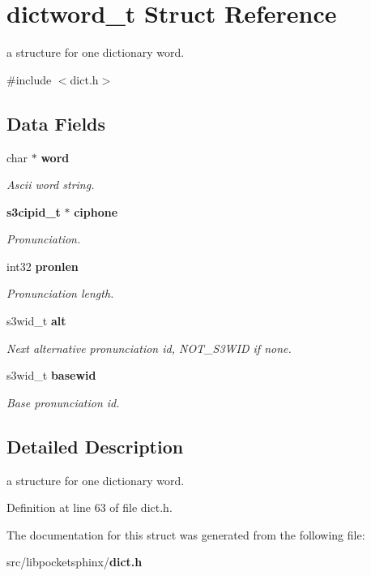\section{dictword\-\_\-t Struct Reference}
\label{structdictword__t}


a structure for one dictionary word.  




{\ttfamily \#include $<$dict.\-h$>$}

\subsection*{Data Fields}
\begin{DoxyCompactItemize}
\item 
char $\ast$ {\bf word}\label{structdictword__t_a3f3371918a406e26817bd4f2cecd7329}

\begin{DoxyCompactList}\small\item\em Ascii word string. \end{DoxyCompactList}\item 
{\bf s3cipid\-\_\-t} $\ast$ {\bf ciphone}\label{structdictword__t_acf5836b5a681485868e9090ad67366d5}

\begin{DoxyCompactList}\small\item\em Pronunciation. \end{DoxyCompactList}\item 
int32 {\bf pronlen}\label{structdictword__t_a50509f28a4b64d76519bfadea12f0fa0}

\begin{DoxyCompactList}\small\item\em Pronunciation length. \end{DoxyCompactList}\item 
s3wid\-\_\-t {\bf alt}\label{structdictword__t_a84b63cd03706221645f46b2da09e9540}

\begin{DoxyCompactList}\small\item\em Next alternative pronunciation id, N\-O\-T\-\_\-\-S3\-W\-I\-D if none. \end{DoxyCompactList}\item 
s3wid\-\_\-t {\bf basewid}\label{structdictword__t_a53dd72f96a9de21d8925e246cc7c036f}

\begin{DoxyCompactList}\small\item\em Base pronunciation id. \end{DoxyCompactList}\end{DoxyCompactItemize}


\subsection{Detailed Description}
a structure for one dictionary word. 

Definition at line 63 of file dict.\-h.



The documentation for this struct was generated from the following file\-:\begin{DoxyCompactItemize}
\item 
src/libpocketsphinx/{\bf dict.\-h}\end{DoxyCompactItemize}
